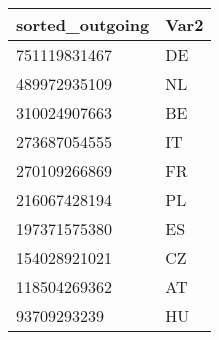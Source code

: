 \begin{tabular}{ll}
sorted_outgoing & Var2 \\ 
\hline 
751119831467 & DE \\ 
489972935109 & NL \\ 
310024907663 & BE \\ 
273687054555 & IT \\ 
270109266869 & FR \\ 
216067428194 & PL \\ 
197371575380 & ES \\ 
154028921021 & CZ \\ 
118504269362 & AT \\ 
93709293239 & HU \\ 
\hline 
\end{tabular}